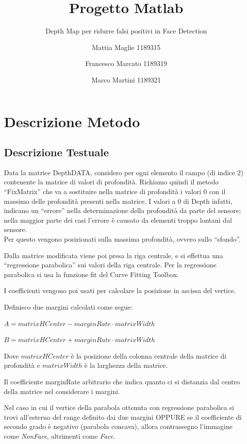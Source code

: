 \documentclass[
  italian,
]{article}
\title{Progetto Matlab}
\subtitle{Depth Map per ridurre falsi positivi in Face Detection}
\author{Mattia Maglie 1189315 \and Francesco Marcato 1189319 \and Marco
Martini 1189321}
\date{}
\begin{document}
\maketitle

\hypertarget{descrizione-metodo}{%
\section{Descrizione Metodo}\label{descrizione-metodo}}

\hypertarget{descrizione-testuale}{%
\subsection{Descrizione Testuale}\label{descrizione-testuale}}

Data la matrice DepthDATA, considero per ogni elemento il campo (di
indice 2) contenente la matrice di valori di profondità. Richiamo quindi
il metodo ``FixMatrix'' che va a sostituire nella matrice di profondità
i valori 0 con il massimo delle profondità presenti nella matrice. I
valori a 0 di Depth infatti, indicano un ``errore'' nella determinazione
della profondità da parte del sensore; nella maggior parte dei casi
l'errore è causato da elementi troppo lontani dal sensore.\\
Per questo vengono posizionati sulla massima profondità, ovvero sullo
``sfondo''.

Dalla matrice modificata viene poi presa la riga centrale, e si effettua
una ``regressione parabolica'' sui valori della riga centrale. Per la
regressione parabolica si usa la funzione fit del Curve Fitting Toolbox.

I coefficienti vengono poi usati per calcolare la posizione in ascissa
del vertice.

Definisco due margini calcolati come segue:

\(A = matrixHCenter - marginRate \cdot matrixWidth\)

\(B = matrixHCenter + marginRate \cdot matrixWidth\)

Dove \(matrixHCenter\) è la posizione della colonna centrale della
matrice di profondità e \(matrixWidth\) è la larghezza della matrice.

Il coefficiente marginRate arbitrario che indica quanto ci si distanzia
dal centro della matrice nel considerare i margini.

Nel caso in cui il vertice della parabola ottenuta con regressione
parabolica si trovi all'esterno del range definito dai due margini
OPPURE se il coefficiente di secondo grado è negativo (parabola
concava), allora contrassegno l'immagine come \emph{NonFace}, altrimenti
come \emph{Face}.
\end{document}
